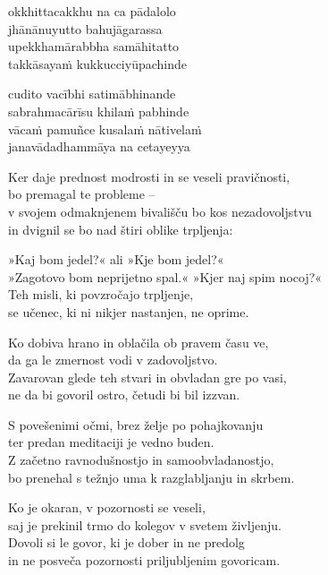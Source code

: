 okkhittacakkhu na ca pādalolo\\
jhānānuyutto bahujāgarassa\\
upekkhamārabbha samāhitatto\\
takkāsayaṁ kukkucciyūpachinde

cudito vacībhi satimābhinande\\
sabrahmacārīsu khilaṁ pabhinde\\
vācaṁ pamuñce kusalaṁ nātivelaṁ\\
janavādadhammāya na cetayeyya


\clearpage

Ker daje prednost modrosti in se veseli pravičnosti,\\
bo premagal te probleme --\\
v svojem odmaknjenem bivališču bo kos nezadovoljstvu\\
in dvignil se bo nad štiri oblike trpljenja:

»Kaj bom jedel?« ali »Kje bom jedel?«\\
»Zagotovo bom neprijetno spal.« »Kjer naj spim nocoj?«\\
Teh misli, ki povzročajo trpljenje,\\
se učenec, ki ni nikjer nastanjen, ne oprime.

Ko dobiva hrano in oblačila ob pravem času ve,\\
da ga le zmernost vodi v zadovoljstvo.\\
Zavarovan glede teh stvari in obvladan gre po vasi,\\
ne da bi govoril ostro, četudi bi bil izzvan.

S povešenimi očmi, brez želje po pohajkovanju\\
ter predan meditaciji je vedno buden.\\
Z začetno ravnodušnostjo in samoobvladanostjo,\\
bo prenehal s težnjo uma k razglabljanju in skrbem.

Ko je okaran, v pozornosti se veseli,\\
saj je prekinil trmo do kolegov v svetem življenju.\\
Dovoli si le govor, ki je dober in ne predolg\\
in ne posveča pozornosti priljubljenim govoricam.


\clearpage

